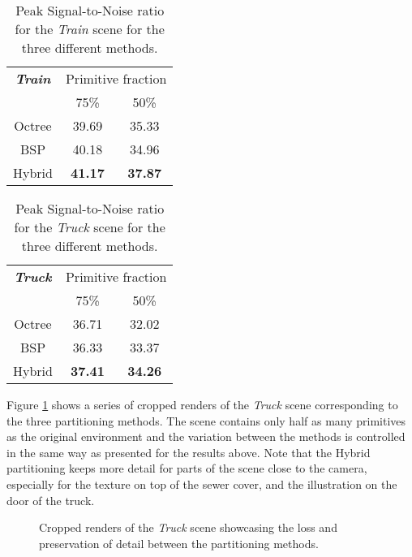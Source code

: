 \begin{table}[H]
\centering
\begin{tabular}{ccc}
\textbf{\textit{Train}}     & \multicolumn{2}{c}{Primitive fraction} \\
\multicolumn{1}{c|}{}       & 75\%               & 50\%              \\ \hline
\multicolumn{1}{c|}{Octree} & 39.69              & 35.33             \\ \hline
\multicolumn{1}{c|}{BSP}    & 40.18              & 34.96             \\ \hline
\multicolumn{1}{c|}{Hybrid} & \textbf{41.17}     & \textbf{37.87}   
\end{tabular}
\caption{Peak Signal-to-Noise ratio for the \textit{Train} scene for the three different methods.}
\label{tab:train_metrics}
\end{table}

\begin{table}[H]
\centering
\begin{tabular}{ccc}
\textbf{\textit{Truck}}     & \multicolumn{2}{c}{Primitive fraction} \\
\multicolumn{1}{c|}{}       & 75\%               & 50\%              \\ \hline
\multicolumn{1}{c|}{Octree} & 36.71              & 32.02             \\ \hline
\multicolumn{1}{c|}{BSP}    & 36.33              & 33.37             \\ \hline
\multicolumn{1}{c|}{Hybrid} & \textbf{37.41}     & \textbf{34.26}   
\end{tabular}
\caption{Peak Signal-to-Noise ratio for the \textit{Truck} scene for the three different methods.}
\label{tab:truck_metrics}
\end{table}

Figure \ref{fig:truck_render} shows a series of cropped renders of the \textit{Truck} scene corresponding to the three partitioning methods. The scene contains only half as many primitives as the original environment and the variation between the methods is controlled in the same way as presented for the results above. Note that the Hybrid partitioning keeps more detail for parts of the scene close to the camera, especially for the texture on top of the sewer cover, and the illustration on the door of the truck.

\begin{figure}[H]
    \centering
    
    \caption{Cropped renders of the \textit{Truck} scene showcasing the loss and preservation of detail between the partitioning methods.}
    \label{fig:truck_render}
\end{figure}


